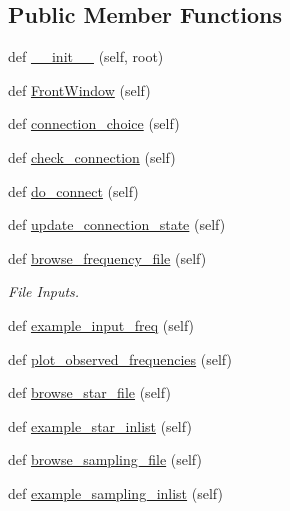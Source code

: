 \subsection*{Public Member Functions}
\begin{DoxyCompactItemize}
\item 
def \hyperlink{classasamba_1_1frontend_1_1_g_u_i_adff8117b4f723520f100119d38f9b567}{\+\_\+\+\_\+init\+\_\+\+\_\+} (self, root)
\item 
def \hyperlink{classasamba_1_1frontend_1_1_g_u_i_acaec11d5fbe0228d9da0e3ba10a4ea33}{Front\+Window} (self)
\item 
def \hyperlink{classasamba_1_1frontend_1_1_g_u_i_a4c88f62e31fe47af19c81215df643945}{connection\+\_\+choice} (self)
\item 
def \hyperlink{classasamba_1_1frontend_1_1_g_u_i_aacca71c626bd1753c1277e13b5ad8eec}{check\+\_\+connection} (self)
\item 
def \hyperlink{classasamba_1_1frontend_1_1_g_u_i_afb43aa6632c5aa17f9cf4a0270659a7f}{do\+\_\+connect} (self)
\item 
def \hyperlink{classasamba_1_1frontend_1_1_g_u_i_a905cc040d83a85cd64003f98b859a64a}{update\+\_\+connection\+\_\+state} (self)
\item 
def \hyperlink{classasamba_1_1frontend_1_1_g_u_i_aece59ad9eaff01043c324f9fa2175c98}{browse\+\_\+frequency\+\_\+file} (self)
\begin{DoxyCompactList}\small\item\em File Inputs. \end{DoxyCompactList}\item 
def \hyperlink{classasamba_1_1frontend_1_1_g_u_i_a515d6655fbf006441ec5ac9b96e5bd7c}{example\+\_\+input\+\_\+freq} (self)
\item 
def \hyperlink{classasamba_1_1frontend_1_1_g_u_i_addc94b5d78cdf85660cc6b2b61377252}{plot\+\_\+observed\+\_\+frequencies} (self)
\item 
def \hyperlink{classasamba_1_1frontend_1_1_g_u_i_a092f06f2cb8a31817b414a34f9dc52cf}{browse\+\_\+star\+\_\+file} (self)
\item 
def \hyperlink{classasamba_1_1frontend_1_1_g_u_i_a30a1139534dbd25b7635bd39c649a219}{example\+\_\+star\+\_\+inlist} (self)
\item 
def \hyperlink{classasamba_1_1frontend_1_1_g_u_i_ac0b39055d224594aca6190e6c0d7fe7e}{browse\+\_\+sampling\+\_\+file} (self)
\item 
def \hyperlink{classasamba_1_1frontend_1_1_g_u_i_a1a0a42d5c06ceb02b8a48dd7ff2f686e}{example\+\_\+sampling\+\_\+inlist} (self)

\end{DoxyCompactItemize}
